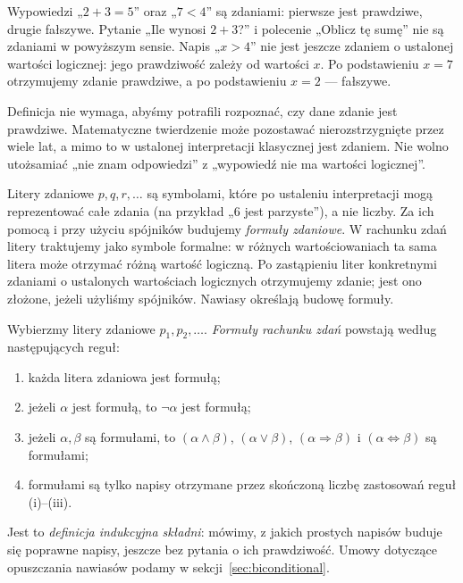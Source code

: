 \begin{przyklad}
Wypowiedzi „$2+3=5$” oraz „$7<4$” są zdaniami: pierwsze jest
prawdziwe, drugie fałszywe. Pytanie „Ile wynosi $2+3$?” i polecenie
„Oblicz tę sumę” nie są zdaniami w powyższym sensie. Napis „$x>4$”
nie jest jeszcze zdaniem o ustalonej wartości logicznej: jego
prawdziwość zależy od wartości $x$. Po podstawieniu $x=7$ otrzymujemy
zdanie prawdziwe, a po podstawieniu $x=2$ --- fałszywe.
\end{przyklad}

\begin{uwaga}
Definicja nie wymaga, abyśmy potrafili rozpoznać, czy dane zdanie
jest prawdziwe. Matematyczne twierdzenie może pozostawać nierozstrzygnięte
przez wiele lat, a mimo to w ustalonej interpretacji klasycznej
jest zdaniem. Nie wolno utożsamiać „nie znam odpowiedzi” z
„wypowiedź nie ma wartości logicznej”.
\end{uwaga}

\begin{definicja}
Litery zdaniowe $p,q,r,\ldots$ są symbolami, które po ustaleniu
interpretacji mogą reprezentować całe zdania (na przykład „$6$ jest
parzyste”), a nie liczby. Za ich pomocą i przy użyciu spójników
budujemy \emph{formuły zdaniowe}. W rachunku zdań litery traktujemy
jako symbole formalne: w różnych wartościowaniach ta sama litera
może otrzymać różną wartość logiczną. Po zastąpieniu liter
konkretnymi zdaniami o ustalonych wartościach logicznych
otrzymujemy zdanie; jest ono złożone, jeżeli użyliśmy
spójników. Nawiasy określają budowę formuły.
\end{definicja}

\begin{definicja}
\label{def:propositional-grammar-xli}
Wybierzmy litery zdaniowe $p_1,p_2,\ldots$.
\emph{Formuły rachunku zdań} powstają według następujących reguł:
\begin{enumerate}[label=(\roman*)]
\item każda litera zdaniowa jest formułą;
\item jeżeli $\alpha$ jest formułą, to $\neg\alpha$ jest formułą;
\item jeżeli $\alpha,\beta$ są formułami, to
      $(\alpha\land\beta)$, $(\alpha\lor\beta)$,
      $(\alpha\Rightarrow\beta)$ i
      $(\alpha\Leftrightarrow\beta)$ są formułami;
\item formułami są tylko napisy otrzymane przez skończoną liczbę
      zastosowań reguł (i)--(iii).
\end{enumerate}
Jest to \emph{definicja indukcyjna składni}: mówimy, z jakich
prostych napisów buduje się poprawne napisy, jeszcze bez pytania
o ich prawdziwość. Umowy dotyczące opuszczania nawiasów
podamy w sekcji~\ref{sec:biconditional}.
\end{definicja}

